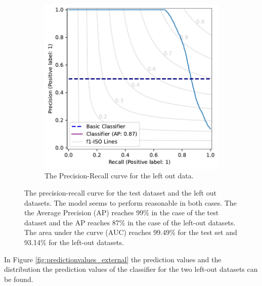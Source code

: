 \documentclass[a4paper, 12pt, oneside]{book} %
\begin{document}
\begin{figure} [htpb]
\begin{subfigure}[b]{0.48\textwidth}
         \includegraphics[width=\textwidth]{precision_recall_plot_extern.pdf}
         \caption{The Precision-Recall curve for the left out data.}
         \label{fig:precision_recall_curve_test_external}
     \end{subfigure}
     \caption[Precision recall curves for test and left-out datasets]{The precision-recall curve for the test dataset and the left out datasets. The model seems to perform reasonable in both cases. The the Average Precision (AP) reaches 99\% in the case of the test dataset and the AP reaches 87\% in the case of the left-out datasets. The area under the curve (AUC) reaches 99.49\% for the test set and 93.14\% for the left-out datasets.}
     \label{fig:precision-recall}
\end{figure}

In Figure \ref{fig:predictionvalues_external} the prediction values and the distribution the prediction values of the classifier for the two left-out datasets can be found.

\end{document}
